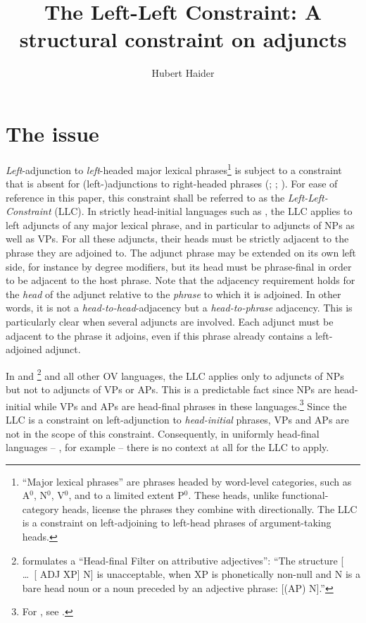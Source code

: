 \documentclass[output=paper
  ,nobabel
  ,uniformtopskip %
]{langscibook}
\title{The Left-Left Constraint: A structural constraint on adjuncts}
\author{Hubert Haider\orcid{0000-0001-7052-7607}\affiliation{University Salzburg}}
\begin{document}
\maketitle

\section{The issue}\label{sec-issue}

\emph{Left}-adjunction to \emph{left}-headed major lexical phrases\footnote{%
  ``Major lexical phrases'' are phrases headed by word-level categories, such as A$^0$, N$^0$, V$^0$, and to a
  limited extent P$^0$. These heads, unlike functional-category heads, license the phrases they combine with directionally. The LLC is a constraint on left-adjoining to left-head phrases of argument-taking heads.}  
is subject to a constraint that is absent for (left-)adjunctions to
right-headed phrases (\citealp[782--785]{Haider2004}; \citealp[194]{Haider2010}; \citealp[13--16,
34--37]{Haider2013}). For ease of reference in this paper, this constraint shall be referred to as
the \emph{Left-Left-Constraint} (LLC). In strictly head-initial languages such as , the LLC
applies to left adjuncts of any major lexical phrase, and in particular to adjuncts of NPs as well
as VPs. For all these adjuncts, their heads must be strictly adjacent to the phrase they are
adjoined to. The adjunct phrase may be extended on its own left side, for instance by degree
modifiers, but its head must be phrase-final in order to be adjacent to the host phrase. Note that
the adjacency requirement holds for the \emph{head} of the adjunct relative to the \emph{phrase} to
which it is adjoined. In other words, it is not a \emph{head-to-head}-adjacency but a
\emph{head-to-phrase} adjacency. This is particularly clear when several adjuncts are involved. Each
adjunct must be adjacent to the phrase it adjoins, even if this phrase already contains a
left-adjoined adjunct.

In  and %
\footnote{\citet[292]{Broekhuis2013} formulates a ``Head-final Filter on attributive adjectives'':
``The structure [ \ldots\ [ ADJ XP] N\sharp] is unacceptable, when XP is phonetically non-null and N\sharp{} is a bare head noun or a noun preceded by an adjective phrase: [(AP) N].''
}
and all other  OV languages, the LLC applies only to adjuncts of NPs but not to adjuncts of\kern1pt{}
VPs or APs. This is a predictable fact since NPs are head-initial while VPs and APs are head-final phrases in these languages.\footnote{For , see \citet*[291--293]{Broekhuis2013}.}  Since the LLC is a constraint on left-adjunction to \emph{head-initial} phrases, VPs and APs are not in the scope of this constraint. Consequently, in uniformly head-final languages – , for example – there is no context at all for the LLC to apply.
\end{document}
